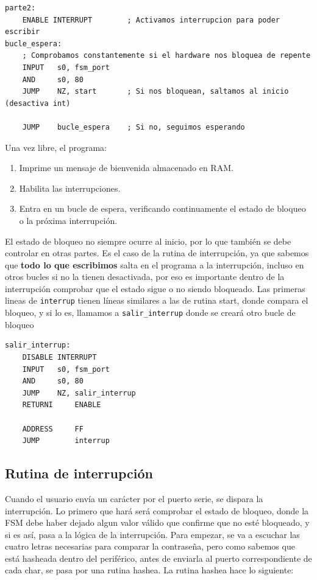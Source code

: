 \documentclass[a4paper, 12pt]{report}
\begin{document}
\begin{lstlisting}[caption={Bucle espera}]
parte2:
    ENABLE INTERRUPT        ; Activamos interrupcion para poder escribir
bucle_espera:
    ; Comprobamos constantemente si el hardware nos bloquea de repente
    INPUT   s0, fsm_port
    AND     s0, 80
    JUMP    NZ, start       ; Si nos bloquean, saltamos al inicio (desactiva int)

    JUMP    bucle_espera    ; Si no, seguimos esperando
\end{lstlisting}

Una vez libre, el programa:
\begin{enumerate}
    \item Imprime un mensaje de bienvenida almacenado en RAM.
    \item Habilita las interrupciones.
    \item Entra en un bucle de espera, verificando continuamente el estado de bloqueo o la próxima interrupción.
\end{enumerate}

El estado de bloqueo no siempre ocurre al inicio, por lo que también se debe controlar en otras partes. Es el caso de la rutina de interrupción, ya que sabemos que \textbf{todo lo que escribimos} salta en el programa a la interrupción, incluso en otros bucles si no la tienen desactivada, por eso es importante dentro de la interrupción comprobar que el estado sigue o no siendo bloqueado. Las primeras lineas de \texttt{interrup} tienen líneas similares a las de rutina start, donde compara el bloqueo, y si lo es, llamamos a \texttt{salir\_interrup} donde se creará otro bucle de bloqueo

\begin{lstlisting}[caption={Bloquear interrupciones}]
salir_interrup:
    DISABLE INTERRUPT
    INPUT   s0, fsm_port
    AND     s0, 80
    JUMP    NZ, salir_interrup
    RETURNI     ENABLE

    ADDRESS     FF
    JUMP        interrup
\end{lstlisting}

\subsection{Rutina de interrupción}

Cuando el usuario envía un carácter por el puerto serie, se dispara la interrupción. Lo primero que hará será comprobar el estado de bloqueo, donde la FSM debe haber dejado algun valor válido que confirme que no esté bloqueado, y si es así, pasa a la lógica de la interrupción. Para empezar, se va a escuchar las cuatro letras necesarias para comparar la contraseña, pero como sabemos que está hasheada dentro del periférico, antes de enviarla al puerto correspondiente de cada char, se pasa por una rutina hashea. La rutina hashea hace lo siguiente:
\end{document}
